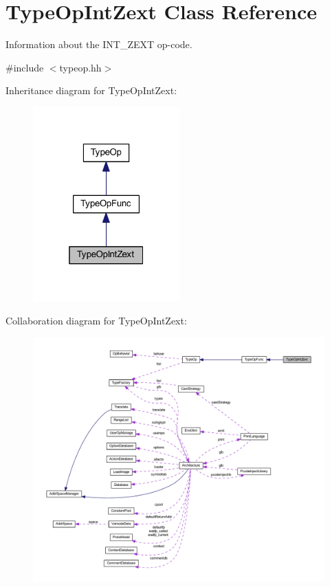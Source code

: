 \hypertarget{class_type_op_int_zext}{}\section{Type\+Op\+Int\+Zext Class Reference}
\label{class_type_op_int_zext}


Information about the I\+N\+T\+\_\+\+Z\+E\+XT op-\/code.  




{\ttfamily \#include $<$typeop.\+hh$>$}



Inheritance diagram for Type\+Op\+Int\+Zext\+:
\nopagebreak
\begin{figure}[H]
\begin{center}
\leavevmode
\includegraphics[width=160pt]{class_type_op_int_zext__inherit__graph}
\end{center}
\end{figure}


Collaboration diagram for Type\+Op\+Int\+Zext\+:
\nopagebreak
\begin{figure}[H]
\begin{center}
\leavevmode
\includegraphics[width=350pt]{class_type_op_int_zext__coll__graph}
\end{center}
\end{figure}
